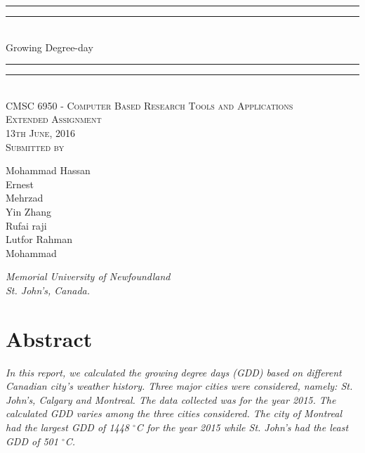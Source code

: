 \documentclass{article}
\begin{document}
{\centering

\rule{\textwidth}{1.6pt}\vspace*{-\baselineskip}\vspace*{2pt} 
\rule{\textwidth}{0.4pt}\\[\baselineskip] 
{\LARGE Growing Degree-day}
\rule{\textwidth}{0.4pt}\vspace*{-\baselineskip}\vspace{3.2pt}
\rule{\textwidth}{1.6pt}\\[\baselineskip] 

\vspace{20mm} %
\scshape %
CMSC 6950 - Computer Based Research Tools and Applications \\ [\baselineskip]
Extended Assignment \\[\baselineskip] 
13th June, 2016 \\[\baselineskip] 
\vspace{20mm} %
Submitted by \\[\baselineskip]
{\Large Mohammad Hassan \\ Ernest \\ Mehrzad \\ Yin Zhang \\ Rufai raji \\ Lutfor Rahman \\ Mohammad\par}
\vfill
{\itshape Memorial University of Newfoundland \\ St. John's, Canada.\par} 
}

\newpage

{\centering
  \section*{Abstract}
}

{\itshape In this report, we calculated the growing degree days (GDD) based on different Canadian city's weather history. Three major cities were considered, namely: St. John’s, Calgary and Montreal. The data collected was for the year 2015. The calculated GDD varies among the three cities considered. The city of Montreal had the largest GDD of 1448 $^{\circ}$C for the year 2015 while St. John's had the least GDD of 501 $^{\circ}$C. 
}

\newpage
\tableofcontents
\newpage
\end{document}
